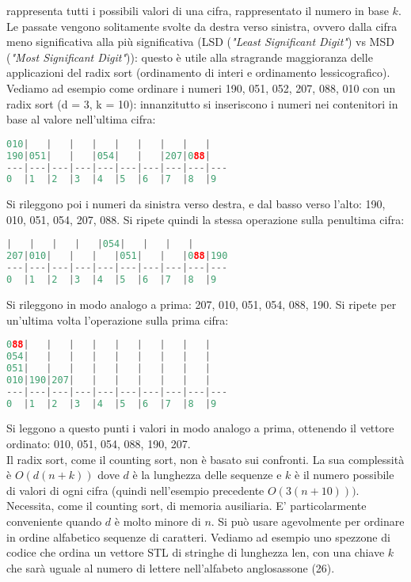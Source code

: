 \documentclass[a4paper,12pt]{article}
\begin{document}
rappresenta tutti i possibili valori di una cifra, rappresentato il numero in base $k$.
Le passate vengono solitamente svolte da destra verso sinistra, ovvero dalla cifra meno significativa alla più significativa (LSD (\textit{"Least Significant Digit"}) vs MSD (\textit{"Most Significant Digit"})):
questo è utile alla stragrande maggioranza delle applicazioni del radix sort (ordinamento di interi e ordinamento lessicografico). \\
Vediamo ad esempio come ordinare i numeri 190, 051, 052, 207, 088, 010 con un radix sort (d = 3, k = 10):
innanzitutto si inseriscono i numeri nei contenitori in base al valore nell'ultima cifra:
\begin{lstlisting}[language=C++]
010|   |   |   |   |   |   |   |   |
190|051|   |   |054|   |   |207|088|   
---|---|---|---|---|---|---|---|---|---
0  |1  |2  |3  |4  |5  |6  |7  |8  |9
\end{lstlisting}
Si rileggono poi i numeri da sinistra verso destra, e dal basso verso l'alto: 190, 010, 051, 054, 207, 088.
Si ripete quindi la stessa operazione sulla penultima cifra:
\begin{lstlisting}[language=C++]
   |   |   |   |   |054|   |   |   |
207|010|   |   |   |051|   |   |088|190   
---|---|---|---|---|---|---|---|---|---
0  |1  |2  |3  |4  |5  |6  |7  |8  |9
\end{lstlisting}
Si rileggono in modo analogo a prima: 207, 010, 051, 054, 088, 190.
Si ripete per un'ultima volta l'operazione sulla prima cifra:
\begin{lstlisting}[language=C++]
088|   |   |   |   |   |   |   |   |
054|   |   |   |   |   |   |   |   |
051|   |   |   |   |   |   |   |   |
010|190|207|   |   |   |   |   |   |   
---|---|---|---|---|---|---|---|---|---
0  |1  |2  |3  |4  |5  |6  |7  |8  |9
\end{lstlisting}
Si leggono a questo punti i valori in modo analogo a prima, ottenendo il vettore ordinato: 010, 051, 054, 088, 190, 207. \\
Il radix sort, come il counting sort, non è basato sui confronti. La sua complessità è $O(d(n+k))$ dove $d$ è la lunghezza delle
sequenze e $k$ è il numero possibile di valori di ogni cifra (quindi nell'esempio precedente $O(3(n+10)))$. Necessita, come il 
counting sort, di memoria ausiliaria. E' particolarmente conveniente quando $d$ è molto minore di $n$. Si può usare agevolmente
per ordinare in ordine alfabetico sequenze di caratteri. Vediamo ad esempio uno spezzone di codice che ordina un vettore STL di stringhe
di lunghezza len, con una chiave $k$ che sarà uguale al numero di lettere nell'alfabeto anglosassone (26).
\end{document}
